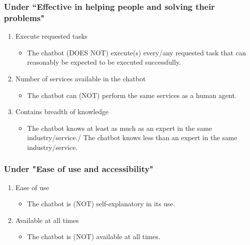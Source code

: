 \subsubsection{Under ``Effective in helping people and solving their problems"}
\begin{enumerate}
	\item Execute requested tasks
	\begin{itemize}
		\item The chatbot (DOES NOT) execute(s) every/any requested task that can reasonably be expected to be executed successfully.
	\end{itemize}
	\item Number of services available in the chatbot
	\begin{itemize}
		\item The chatbot can (NOT) perform the same services as a human agent.
	\end{itemize}
	\item Contains breadth of knowledge
	\begin{itemize}
		\item The chatbot knows at least as much as an expert in the same industry/service./ The chatbot knows less than an expert in the same industry/service.
	\end{itemize}
\end{enumerate}

\subsubsection{Under "Ease of use and accessibility"}
\begin{enumerate}
	\item Ease of use
	\begin{itemize}
		\item The chatbot is (NOT) self-explanatory in its use.
	\end{itemize}
	\item Available at all times
	\begin{itemize}
		\item The chatbot is (NOT) available at all times.
	\end{itemize}
\end{enumerate}

